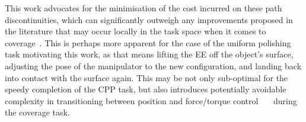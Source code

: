 \documentclass[journal]{IEEEtran}
\begin{document}
This work advocates for the minimisation of the cost incurred on these path discontinuities, which can significantly 
outweigh any improvements proposed in the literature that may occur locally in the task space when it comes 
to coverage~\cite{hassan2018a}. This is perhaps more apparent for the case of the uniform polishing task motivating this work, 
as that means lifting the EE off the object's surface, adjusting the pose of the manipulator to the new configuration, and landing back into contact with the surface again.
This may be not only sub-optimal for the speedy completion of the CPP task, but also introduces potentially avoidable complexity in transitioning between position and force/torque control~\cite{mirrazavi2018a}~\cite{solanes2018adaptive}~\cite{solanes2019robust} %
during the coverage task. 
\end{document}
